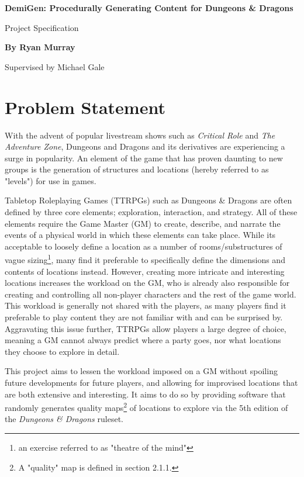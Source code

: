 \documentclass{article}
\begin{document}
\thispagestyle{plain}
\begin{center}
    \Large
    \textbf{DemiGen: Procedurally Generating Content for Dungeons \& Dragons}
 
    \vspace{0.4cm}
    \large
    Project Specification
 
    \vspace{0.4cm}
    \textbf{By Ryan Murray}

    \vspace{0.4cm}
    \large
    Supervised by Michael Gale
\end{center}

\section{Problem Statement}
With the advent of popular livestream shows such as \textit{Critical Role} and \textit{The Adventure Zone}, Dungeons and Dragons and its derivatives are experiencing a surge in popularity.
An element of the game that has proven daunting to new groups is the generation of structures and locations (hereby referred to as "levels") for use in games. 



Tabletop Roleplaying Games (TTRPGs) such as Dungeons \& Dragons are often defined by three core elements; exploration, interaction, and strategy. All of these elements require the Game Master (GM) to create, describe, and narrate the events of a physical world in which these elements can take place.
While its acceptable to loosely define a location as a number of rooms/substructures of vague sizing\footnote{an exercise referred to as "theatre of the mind"}, many find it preferable to specifically define the dimensions and contents of locations instead.
However, creating more intricate and interesting locations increases the workload on the GM, who is already also responsible for creating and controlling all non-player characters and the rest of the game world.
This workload is generally not shared with the players, as many players find it preferable to play content they are not familiar with and can be surprised by. 
Aggravating this issue further, TTRPGs allow players a large degree of choice, meaning a GM cannot always predict where a party goes, nor what locations they choose to explore in detail.

This project aims to lessen the workload imposed on a GM without spoiling future developments for future players, and allowing for improvised locations that are both extensive and interesting. 
It aims to do so by providing software that randomly generates quality maps\footnote{A "quality" map is defined in section 2.1.1.} of locations to explore via the 5th edition of the \textit{Dungeons \& Dragons} ruleset.
\end{document}
